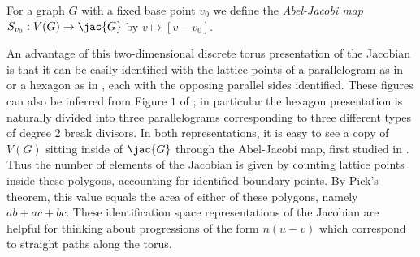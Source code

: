 \begin{defi}
For a graph $G$ with a fixed base point $v_0$ we define the \textit{Abel-Jacobi map} $S_{v_0}:V(G)\to \jac{G}$ by $v \mapsto [v-v_0]$.
\end{defi}

\begin{rema}
    An advantage of this two-dimensional discrete torus presentation of the Jacobian is that it can be easily identified with the lattice points of a parallelogram as in  or a hexagon as in , each with the opposing parallel sides identified.
    These figures can also be inferred from Figure $1$ of \cite{ABKS}; in particular the hexagon presentation is naturally divided into three parallelograms corresponding to three different types of degree $2$ break divisors.
    In both representations, it is easy to see a copy of $V(G)$ sitting inside of $\jac{G}$ through the Abel-Jacobi map, first studied in \cite{BakNor07}.
    Thus the number of elements of the Jacobian is given by counting lattice points inside these polygons, accounting for identified boundary points. By Pick's theorem, this value equals the area of either of these polygons, namely $ab+ ac+bc$. These identification space representations of the Jacobian are helpful for thinking about progressions of the form $n(u-v)$ which correspond to straight paths along the torus. 
\end{rema}

